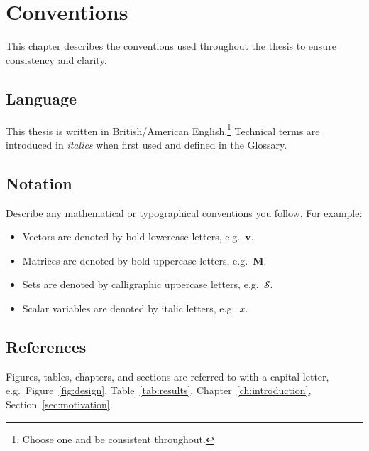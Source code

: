 \chapter*{Conventions}

This chapter describes the conventions used throughout the thesis to ensure consistency and clarity.

\section*{Language}

This thesis is written in British/American English.\footnote{Choose one and be consistent throughout.} Technical terms are introduced in \emph{italics} when first used and defined in the Glossary.

\section*{Notation}

Describe any mathematical or typographical conventions you follow. For example:

\begin{itemize}
  \item Vectors are denoted by bold lowercase letters, e.g.\ $\mathbf{v}$.
  \item Matrices are denoted by bold uppercase letters, e.g.\ $\mathbf{M}$.
  \item Sets are denoted by calligraphic uppercase letters, e.g.\ $\mathcal{S}$.
  \item Scalar variables are denoted by italic letters, e.g.\ $x$.
\end{itemize}

\section*{References}

Figures, tables, chapters, and sections are referred to with a capital letter, e.g.\ Figure~\ref{fig:design}, Table~\ref{tab:results}, Chapter~\ref{ch:introduction}, Section~\ref{sec:motivation}.
